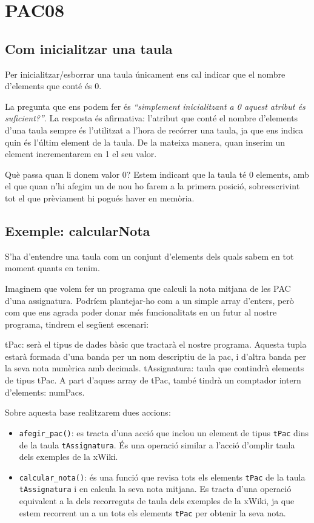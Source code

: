 \documentclass[]{book}
\providecommand{\tightlist}{%
  \setlength{\itemsep}{0pt}\setlength{\parskip}{0pt}}
\begin{document}
\chapter{PAC08}\label{pac08}

\section{Com inicialitzar una taula}\label{com-inicialitzar-una-taula}

Per inicialitzar/esborrar una taula únicament ens cal indicar que el
nombre d'elements que conté és 0.

La pregunta que ens podem fer és \emph{``simplement inicialitzant a 0
aquest atribut és suficient?''}. La resposta és afirmativa: l'atribut
que conté el nombre d'elements d'una taula sempre és l'utilitzat a
l'hora de recórrer una taula, ja que ens indica quin és l'últim element
de la taula. De la mateixa manera, quan inserim un element incrementarem
en 1 el seu valor.

Què passa quan li donem valor 0? Estem indicant que la taula té 0
elements, amb el que quan n'hi afegim un de nou ho farem a la primera
posició, sobreescrivint tot el que prèviament hi pogués haver en
memòria.

\section{Exemple: calcularNota}\label{exemple-calcularnota}

S'ha d'entendre una taula com un conjunt d'elements dels quals sabem en
tot moment quants en tenim.

Imaginem que volem fer un programa que calculi la nota mitjana de les
PAC d'una assignatura. Podríem plantejar-ho com a un simple array
d'enters, però com que ens agrada poder donar més funcionalitats en un
futur al nostre programa, tindrem el següent escenari:

tPac: serà el tipus de dades bàsic que tractarà el nostre programa.
Aquesta tupla estarà formada d'una banda per un nom descriptiu de la
pac, i d'altra banda per la seva nota numèrica amb decimals.
tAssignatura: taula que contindrà elements de tipus tPac. A part d'aques
array de tPac, també tindrà un comptador intern d'elements: numPacs.

Sobre aquesta base realitzarem dues accions:

\begin{itemize}
\tightlist
\item
  \texttt{afegir\_pac()}: es tracta d'una acció que inclou un element de
  tipus \texttt{tPac} dins de la taula \texttt{tAssignatura}. És una
  operació similar a l'acció d'omplir taula dels exemples de la xWiki.
\item
  \texttt{calcular\_nota()}: és una funció que revisa tots els elements
  \texttt{tPac} de la taula \texttt{tAssignatura} i en calcula la seva
  nota mitjana. Es tracta d'una operació equivalent a la dels
  recorreguts de taula dels exemples de la xWiki, ja que estem recorrent
  un a un tots els elements \texttt{tPac} per obtenir la seva nota.
\end{itemize}
\end{document}
